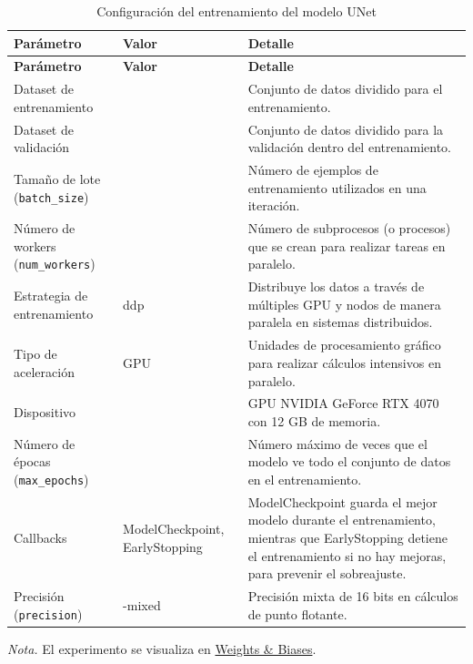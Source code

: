 \begin{longtable}{>{\raggedright\arraybackslash}p{5cm}>{\raggedright\arraybackslash}p{3cm}>{\raggedright\arraybackslash}p{7cm}}
    \caption{Configuración del entrenamiento del modelo UNet}  \label{tab:config_train_unet} \\
    \hline
    \textbf{Parámetro} & \textbf{Valor} & \textbf{Detalle} \\
    \hline
    \endfirsthead
    \hline
    \textbf{Parámetro} & \textbf{Valor} & \textbf{Detalle} \\
    \hline
    \endhead
    \hline
    \endfoot
    \hline
    \endlastfoot
    Dataset de entrenamiento & 675 & Conjunto de datos dividido para el entrenamiento. \\
    Dataset de validación & 168 & Conjunto de datos dividido para la validación dentro del entrenamiento. \\    
    Tamaño de lote (\texttt{batch\_size}) & 16 & Número de ejemplos de entrenamiento utilizados en una iteración. \\
    Número de workers (\texttt{num\_workers}) & 16 & Número de subprocesos (o procesos) que se crean para realizar tareas en paralelo. \\
    Estrategia de entrenamiento & ddp & Distribuye los datos a través de múltiples GPU y nodos de manera paralela en sistemas distribuidos. \\
    Tipo de aceleración & GPU & Unidades de procesamiento gráfico para realizar cálculos intensivos en paralelo. \\
    Dispositivo & 0 & GPU NVIDIA GeForce RTX 4070 con 12 GB de memoria. \\
    Número de épocas (\texttt{max\_epochs}) & 50 & Número máximo de veces que el modelo ve todo el conjunto de datos en el entrenamiento. \\
    Callbacks & ModelCheckpoint, EarlyStopping & ModelCheckpoint guarda el mejor modelo durante el entrenamiento, mientras que EarlyStopping detiene el 
    entrenamiento si no hay mejoras, para prevenir el sobreajuste. \\
    Precisión (\texttt{precision}) & 16-mixed & Precisión mixta de 16 bits en cálculos de punto flotante. \\        
    \hline
\end{longtable}
\begin{flushleft}
    \vspace{-\baselineskip}
    \textit{Nota.} El experimento se visualiza en \href{https://wandb.ai/scigeo/scburning/runs/3nfebv59}{Weights \& Biases}.     
\end{flushleft}

